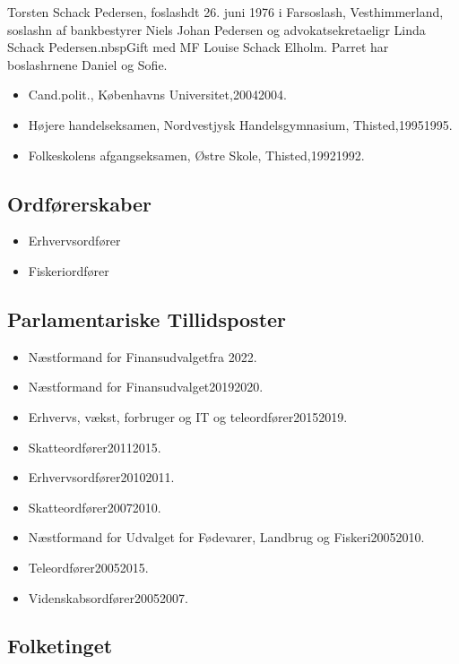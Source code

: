 \documentclass[11pt, a4paper]{awesome-cv}
\begin{document}
\makecvheader[R]
\makelettertitle
\begin{cvletter}
Torsten Schack  Pedersen, foslashdt 26. juni 1976 i Farsoslash, Vesthimmerland, soslashn af bankbestyrer Niels Johan Pedersen og advokatsekretaeligr Linda Schack Pedersen.nbspGift med MF Louise Schack Elholm. Parret har boslashrnene Daniel og Sofie.

\begin{itemize}
\item Cand.polit., Københavns Universitet,20042004.
\item Højere handelseksamen, Nordvestjysk Handelsgymnasium, Thisted,19951995.
\item Folkeskolens afgangseksamen, Østre Skole, Thisted,19921992.
\end{itemize}
\subsection*{Ordførerskaber}
\begin{itemize}
\item Erhvervsordfører
\item Fiskeriordfører
\end{itemize}
\subsection*{Parlamentariske Tillidsposter}
\begin{itemize}
\item Næstformand for Finansudvalgetfra 2022.
\item Næstformand for Finansudvalget20192020.
\item Erhvervs, vækst, forbruger og IT og teleordfører20152019.
\item Skatteordfører20112015.
\item Erhvervsordfører20102011.
\item Skatteordfører20072010.
\item Næstformand for Udvalget for Fødevarer, Landbrug og Fiskeri20052010.
\item Teleordfører20052015.
\item Videnskabsordfører20052007.
\end{itemize}
\subsection*{Folketinget}

\end{cvletter}
\end{document}
